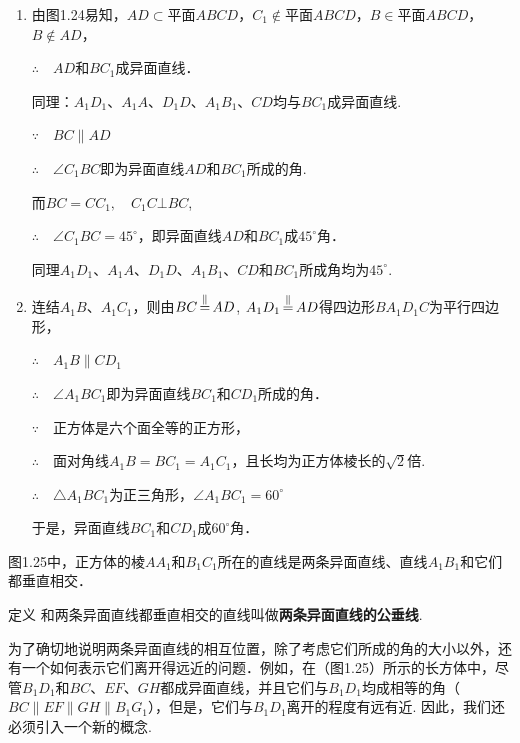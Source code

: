 \begin{solution}
\begin{enumerate}[(1)]
    \item 由图1.24易知，$AD\subset$平面$ABCD$，$C_1\notin$平面$ABCD$，$B\in$平面$ABCD$，$B\notin AD$，

$\therefore\quad    AD$和$BC_1$成异面直线．

同理：$A_1D_1$、$A_1A$、$D_1D$、$A_1B_1$、$CD$均与$BC_1$成异面直线.

$\because\quad BC\parallel AD$

$\therefore\quad \angle C_1BC$即为异面直线$AD$和$BC_1$所成的角.

而$BC=CC_1,\quad C_1C\bot BC$,

$\therefore\quad \angle C_1BC=45^{\circ}$，即异面直线$AD$和$BC_1$成$45^{\circ}$角．

同理$A_1D_1$、$A_1A$、$D_1D$、$A_1B_1$、$CD$和$BC_1$所成角均为$45^{\circ}$.

\item 连结$A_1B$、$A_1C_1$，则由$BC\displaystyle\mathop{=}^{\parallel} AD$, $A_1D_1\displaystyle\mathop{=}^{\parallel} AD$得四边形$BA_1D_1C$为平行四边形，

$\therefore\quad A_1B\parallel CD_1$

$\therefore\quad \angle A_1BC_1$即为异面直线$BC_1$和$CD_1$所成的角．

$\because\quad $正方体是六个面全等的正方形，

$\therefore\quad $面对角线$A_1B=BC_1=A_1C_1$，且长均为正方体棱长的$\sqrt{2}$倍.

$\therefore\quad \triangle A_1BC_1$为正三角形，$\angle A_1BC_1=60^{\circ}$

于是，异面直线$BC_1$和$CD_1$成$60^{\circ}$角．

\end{enumerate}
\end{solution}

图1.25中，正方体的棱$AA_1$和$B_1C_1$所在的直线是两条异面直线、直线$A_1B_1$和它们都垂直相交．

\begin{thm}
    {定义} 和两条异面直线都垂直相交的直线叫做\textbf{两条异面直线的公垂线}.
\end{thm}

为了确切地说明两条异面直线的相互位置，除了考虑它们所成的角的大小以外，还有一个如何表示它们离开得远近的问题．例如，在（图1.25）所示的长方体中，尽管$B_1D_1$和$BC$、$EF$、$GH$都成异面直线，并且它们与$B_1D_1$均成相等的角（$BC\parallel EF\parallel GH\parallel  B_1G_1$），但是，它们与$B_1D_1$离开的程度有远有近. 因此，我们还必须引入一个新的概念.

